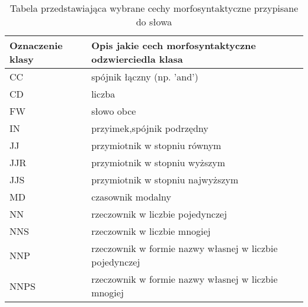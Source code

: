 \begin{table}[p] \centering
    \caption{Tabela przedstawiająca wybrane cechy morfosyntaktyczne przypisane do słowa}
    \label{tab:klasy_morf} 
    \begin{tabular} {| l | l |} \hline
        Oznaczenie klasy & Opis jakie cech morfosyntaktyczne odzwierciedla klasa   \\ \hline\hline
        CC               & spójnik łączny (np. 'and')                              \\ \hline
        CD               & liczba                                                  \\ \hline
        FW               & słowo obce                                              \\ \hline
        IN               & przyimek,spójnik podrzędny                              \\ \hline
        JJ               & przymiotnik w stopniu równym                            \\ \hline
        JJR              & przymiotnik w stopniu wyższym                           \\ \hline
        JJS              & przymiotnik w stopniu najwyższym                        \\ \hline
        MD               & czasownik modalny                                       \\ \hline
        NN               & rzeczownik w liczbie pojedynczej                        \\ \hline
        NNS              & rzeczownik w liczbie mnogiej                            \\ \hline
        NNP              & rzeczownik w formie nazwy własnej w liczbie pojedynczej \\ \hline
        NNPS             & rzeczownik w formie nazwy własnej w liczbie mnogiej     \\ \hline

\end{tabular}
\end{table}
